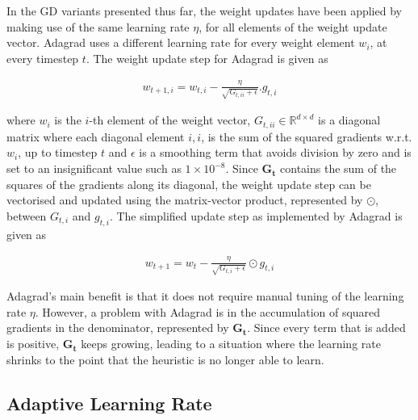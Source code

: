 In the \acs{GD} variants presented thus far, the weight updates have been applied by making use of the same learning rate $\eta$, for all elements of the weight update vector. \Acs{Adagrad} uses a different learning rate for every weight element $w_{i}$, at every timestep $t$. The weight update step for \acs{Adagrad} is given as

\begin{equation}
      \label{eq:heuristics:gd:adagrad_part_1}
      \begin{split}
            w_{t+1,i} = w_{t,i} - \frac{\eta}{\sqrt{G_{t,ii} + \epsilon}}.g_{t,i}
      \end{split}
\end{equation}

where $w_{i}$ is the $i$-th element of the weight vector, $G_{t,ii} \in \mathbb{R}^{d \times d}$ is a diagonal matrix where each diagonal element $i,i$, is the sum of the squared gradients w.r.t. $w_{i}$, up to timestep $t$ and $\epsilon$ is a smoothing term that avoids division by zero and is set to an insignificant value such as $1 \times 10^{-8}$. Since $\boldsymbol{G_{t}}$ contains the sum of the squares of the gradients along its diagonal, the weight update step can be vectorised and updated using the matrix-vector product, represented by $\odot$, between $G_{t,i}$ and $g_{t,i}$. The simplified update step as implemented by \acs{Adagrad} is given as

\begin{equation}
      \label{eq:heuristics:gd:adagrad_part_2}
      \begin{split}
            w_{t+1} = w_{t} - \frac{\eta}{\sqrt{G_{t,i} + \epsilon}} \odot g_{t,i}
      \end{split}
\end{equation}

\Ac{Adagrad}'s main benefit is that it does not require manual tuning of the learning rate $\eta$. However, a problem with \acs{Adagrad} is in the accumulation of squared gradients in the denominator, represented by $\boldsymbol{G_{t}}$. Since every term that is added is positive, $\boldsymbol{G_{t}}$ keeps growing, leading to a situation where the learning rate shrinks to the point that the heuristic is no longer able to learn.

\subsection{Adaptive Learning Rate}\label{sec:heuristics:adadelta}

